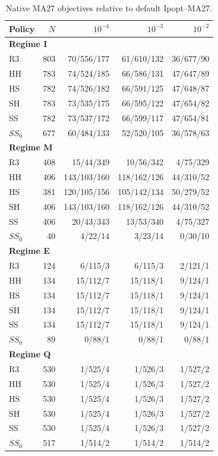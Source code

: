 \documentclass[pdflatex,sn-mathphys-num]{sn-jnl}
\theoremstyle{thmstyleone}
\theoremstyle{thmstylethree}
\begin{document}
\begin{table}[!htbp]
\centering\small
\caption{Native MA27 objectives relative to default Ipopt--MA27.}
\label{tab:thresholds-ma27}

\begin{tabular}{lrrrr}
\toprule
Policy & $N$ & $10^{-4}$ & $10^{-3}$ & $10^{-2}$ \\
\midrule
\multicolumn{5}{l}{\textbf{Regime I}} \\
R3 & 803 & 70/556/177 & 61/610/132 & 36/677/90 \\
HH & 783 & 74/524/185 & 66/586/131 & 47/647/89 \\
HS & 782 & 74/526/182 & 66/591/125 & 47/648/87 \\
SH & 783 & 73/535/175 & 66/595/122 & 47/654/82 \\
SS & 782 & 73/537/172 & 66/599/117 & 47/654/81 \\
$SS_0$ & 677 & 60/484/133 & 52/520/105 & 36/578/63 \\
\midrule
\multicolumn{5}{l}{\textbf{Regime M}} \\
R3 & 408 & 15/44/349 & 10/56/342 & 4/75/329 \\
HH & 406 & 143/103/160 & 118/162/126 & 44/310/52 \\
HS & 381 & 120/105/156 & 105/142/134 & 50/279/52 \\
SH & 406 & 143/103/160 & 118/162/126 & 44/310/52 \\
SS & 406 & 20/43/343 & 13/53/340 & 4/75/327 \\
$SS_0$ & 40 & 4/22/14 & 3/23/14 & 0/30/10 \\
\midrule
\multicolumn{5}{l}{\textbf{Regime E}} \\
R3 & 124 & 6/115/3 & 6/115/3 & 2/121/1 \\
HH & 134 & 15/112/7 & 15/118/1 & 9/124/1 \\
HS & 134 & 15/112/7 & 15/118/1 & 9/124/1 \\
SH & 134 & 15/112/7 & 15/118/1 & 9/124/1 \\
SS & 134 & 15/112/7 & 15/118/1 & 9/124/1 \\
$SS_0$ & 89 & 0/88/1 & 0/88/1 & 0/88/1 \\
\midrule
\multicolumn{5}{l}{\textbf{Regime Q}} \\
R3 & 530 & 1/525/4 & 1/526/3 & 1/527/2 \\
HH & 530 & 1/525/4 & 1/526/3 & 1/527/2 \\
HS & 530 & 1/525/4 & 1/526/3 & 1/527/2 \\
SH & 530 & 1/525/4 & 1/526/3 & 1/527/2 \\
SS & 530 & 1/525/4 & 1/526/3 & 1/527/2 \\
$SS_0$ & 517 & 1/514/2 & 1/514/2 & 1/514/2 \\
\bottomrule
\end{tabular}


\end{table}
\end{document}
